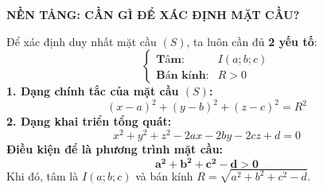 \documentclass[12pt,a4paper]{article}
\begin{document}

\vspace{-0.25cm}

\begin{theorybox}
    \textbf{\textcolor{deepblue}{\faLightbulb\hskip 6pt NỀN TẢNG: CẦN GÌ ĐỂ XÁC ĐỊNH MẶT CẦU?}}
    \par\vspace{4pt}
    \begin{minipage}[c]{0.65\linewidth}
        Để xác định duy nhất mặt cầu $(S)$, ta luôn cần đủ \textbf{2 yếu tố}:
        \[
            \begin{cases} 
                \textbf{Tâm:} & I(a; b; c) \\ 
                \textbf{Bán kính:} & R > 0
            \end{cases}
        \]
        \textbf{1. Dạng chính tắc của mặt cầu $(S)$:}
        \[
            (x - a)^2 + (y - b)^2 + (z - c)^2 = R^2
        \]
        \textbf{2. Dạng khai triển tổng quát:}
        \[
            x^2 + y^2 + z^2 - 2ax - 2by - 2cz + d = 0
        \]
        \textbf{Điều kiện để là phương trình mặt cầu:}
        \[
            \mathbf{a^2 + b^2 + c^2 - d > 0}
        \]
        Khi đó, tâm là $I(a; b; c)$ và bán kính $R = \sqrt{a^2 + b^2 + c^2 - d}$.
    \end{minipage}%
    \hfill
    \begin{minipage}[c]{0.32\linewidth}
        \centering
    \end{minipage}
\end{theorybox}
\end{document}
